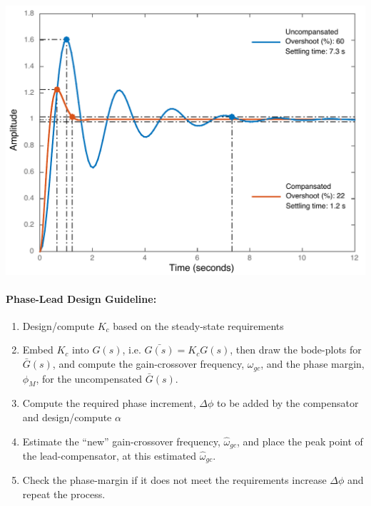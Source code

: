 \documentclass[twoside]{article}
\begin{document}
     \begin{center}
 \begin{minipage}[h]{0.7\linewidth}
     \begin{center}
       \includegraphics[width=\textwidth]{step}
     \end{center}
 \end{minipage}
     \end{center}

\paragraph{Phase-Lead Design Guideline:} 
\begin{enumerate}
	\item Design/compute $K_c$ based on the steady-state requirements 
	\item Embed $K_c$ into $G(s)$, i.e. $ \bar{G(s)} = K_c G(s)$, then 
	draw the bode-plots for $\bar{G}(s)$, and compute the gain-crossover
	frequency, $\omega_{gc}$, and the phase margin, $\phi_M$, for the
	uncompensated $\bar{G}(s)$. 
	\item Compute the required phase increment, $\Delta \phi$ to be
	added by the compensator and design/compute $\alpha$
	\item Estimate the ``new'' gain-crossover frequency, 
	$\hat{\omega}_{gc}$, and place the peak point of the lead-compensator,
	at this estimated $\hat{\omega}_{gc}$. 
	\item Check the phase-margin if it does not meet the requirements
	increase $\Delta \phi$ and repeat the process. 
\end{enumerate}
\end{document}
